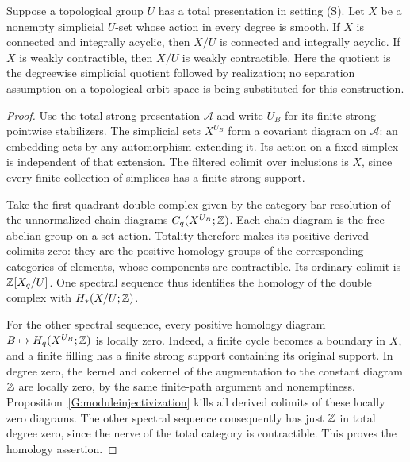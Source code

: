 \begin{lemma}
\label{G:smoothquotient}
Suppose a topological group $U$ has a total presentation in setting
\textup{(S)}. Let $X$ be a nonempty simplicial $U$-set whose action
in every degree is smooth. If $X$ is connected and integrally
acyclic, then $X/U$ is connected and integrally acyclic. If $X$ is
weakly contractible, then $X/U$ is weakly contractible.
Here the quotient is the degreewise simplicial quotient followed
by realization; no separation assumption on a topological orbit
space is being substituted for this construction.
\end{lemma}
\begin{proof}
Use the total strong presentation $\mathcal A$ and write $U_B$ for
its finite strong pointwise stabilizers. The simplicial sets
$X^{U_B}$ form a covariant diagram on $\mathcal A$: an embedding
acts by any automorphism extending it. Its action on a fixed
simplex is independent of that extension. The filtered colimit
over inclusions is $X$, since every finite collection of simplices
has a finite strong support.

Take the first-quadrant double complex given by the category bar
resolution of the unnormalized chain diagrams $C_q(X^{U_B};\mathbb Z)$.
Each chain diagram is the free abelian group on a set action.
Totality therefore makes its positive derived colimits zero:
they are the positive homology groups of the corresponding
categories of elements, whose components are contractible.
Its ordinary colimit is $\mathbb Z[X_q/U]$. One spectral sequence thus
identifies the homology of the double complex with $H_*(X/U;\mathbb Z)$.

For the other spectral sequence, every positive homology diagram
$B\mapsto H_q(X^{U_B};\mathbb Z)$ is locally zero. Indeed, a finite cycle
becomes a boundary in $X$, and a finite filling has a finite strong
support containing its original support. In degree zero, the
kernel and cokernel of the augmentation to the constant diagram
$\mathbb Z$ are locally zero, by the same finite-path argument and
nonemptiness. Proposition~\ref{G:moduleinjectivization} kills all
derived colimits of these locally zero diagrams. The other
spectral sequence consequently has just $\mathbb Z$ in total degree
zero, since the nerve of the total category is contractible.
This proves the homology assertion.


\end{proof}
